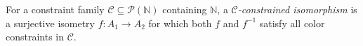 
For a constraint family $\mathcal C\subseteq\mathcal P(\mathbb N)$ containing $\mathbb N$, a \emph{$\mathcal C$-constrained isomorphism} is a surjective isometry $f:A_1\to A_2$ for which both $f$ and $f^{-1}$ satisfy all color constraints in $\mathcal C$.
